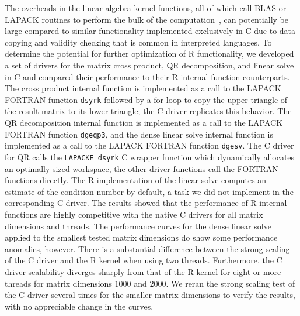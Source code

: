 The overheads in the linear algebra kernel functions, all of which call BLAS or LAPACK
routines to perform the bulk of the computation~\cite{cran:Rmanuals}, can potentially be
large compared to similar functionality implemented exclusively in C due to data copying
and validity checking that is common in interpreted languages. To determine the potential
for further optimization of R functionality, we developed a set of drivers for the matrix
cross product, QR decomposition, and linear solve in C and compared their performance to
their R internal function counterparts. The cross product internal function is
implemented as a call to the LAPACK FORTRAN function \texttt{dsyrk} followed by a for loop
to copy the upper triangle of the result matrix to its lower triangle; the C driver
replicates this behavior. The QR decomposition internal function is implemented as a call
to the LAPACK FORTRAN function \texttt{dgeqp3}, and the dense linear solve internal
function is implemented as a call to the LAPACK FORTRAN function \texttt{dgesv}. The C
driver for QR calls the \texttt{LAPACKE\_dsyrk} C wrapper function which dynamically
allocates an optimally sized workspace, the other driver functions call the FORTRAN
functions directly. The R implementation of the linear solve computes an estimate of the
condition number by default, a task we did not implement in the corresponding C driver.
The results showed that the performance of R internal functions are highly competitive
with the native C drivers for all matrix dimensions and threads. The performance curves
for the dense linear solve applied to the smallest tested matrix dimensions do
show some performance anomalies, however. There is a substantial difference between the
strong scaling of the C driver and the R kernel when using two threads. Furthermore, the C
driver scalability diverges sharply from that of the R kernel for eight or more threads
for matrix dimensions $1000$ and $2000$. We reran the strong scaling test of the C driver
several times for the smaller matrix dimensions to verify the results, with no appreciable
change in the curves.


